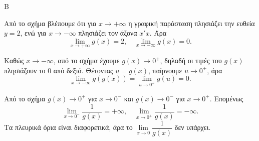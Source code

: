 
\begin{thema}{Β}
\begin{erwthma}
\item Από το σχήμα βλέπουμε ότι για $x\to+\infty$ η γραφική παράσταση πλησιάζει την ευθεία $y=2$, ενώ για $x\to-\infty$ πλησιάζει τον άξονα $x'x$. Άρα
\[
\lim_{x\to+\infty}g(x)=2,\quad \lim_{x\to-\infty}g(x)=0.
\]

\item Καθώς $x\to-\infty$, από το σχήμα έχουμε $g(x)\to0^+$, δηλαδή οι τιμές του $g(x)$ πλησιάζουν το $0$ από δεξιά. Θέτοντας $u=g(x)$, παίρνουμε $u\to0^+$, άρα
\[
\lim_{x\to-\infty}g(g(x))=\lim_{u\to0^+}g(u)=0.
\]

\item Από το σχήμα $g(x)\to0^+$ για $x\to0^-$ και $g(x)\to0^-$ για $x\to0^+$. Επομένως
\[
\lim_{x\to0^-}\frac1{g(x)}=+\infty,\quad
\lim_{x\to0^+}\frac1{g(x)}=-\infty.
\]
Τα πλευρικά όρια είναι διαφορετικά, άρα το $\lim\limits_{x\to0}\dfrac1{g(x)}$ δεν υπάρχει.
\end{erwthma}
\end{thema}


